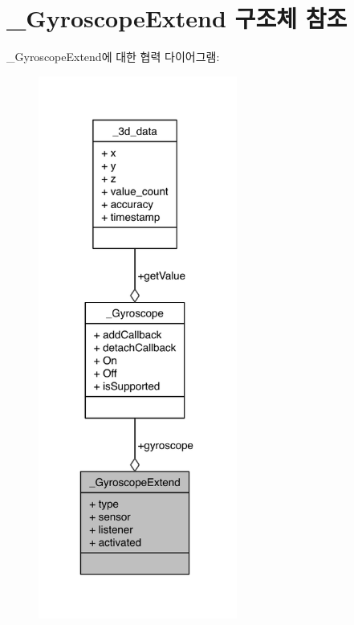 \hypertarget{struct__GyroscopeExtend}{\section{\-\_\-\-Gyroscope\-Extend 구조체 참조}
\label{struct__GyroscopeExtend}
}


\-\_\-\-Gyroscope\-Extend에 대한 협력 다이어그램\-:\nopagebreak
\begin{figure}[H]
\begin{center}
\leavevmode
\includegraphics[width=185pt]{d0/d95/struct__GyroscopeExtend__coll__graph}
\end{center}
\end{figure}
